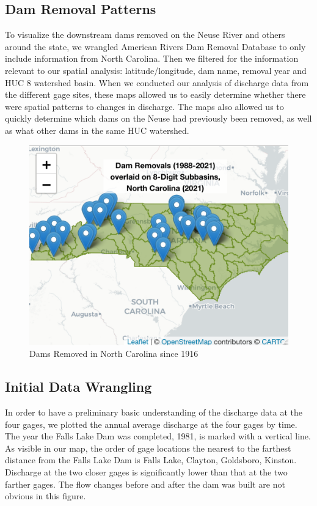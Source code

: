\documentclass[
  12pt,
]{article}
\begin{document}
\hypertarget{dam-removal-patterns}{%
\subsection{Dam Removal Patterns}\label{dam-removal-patterns}}

To visualize the downstream dams removed on the Neuse River and others
around the state, we wrangled American Rivers Dam Removal Database to
only include information from North Carolina. Then we filtered for the
information relevant to our spatial analysis: latitude/longitude, dam
name, removal year and HUC 8 watershed basin. When we conducted our
analysis of discharge data from the different gage sites, these maps
allowed us to easily determine whether there were spatial patterns to
changes in discharge. The maps also allowed us to quickly determine
which dams on the Neuse had previously been removed, as well as what
other dams in the same HUC watershed.

\begin{figure}
\centering
\includegraphics{"./Output/dam.removal.map.png"}
\caption{Dams Removed in North Carolina since 1916}
\end{figure}

\hypertarget{initial-data-wrangling}{%
\subsection{Initial Data Wrangling}\label{initial-data-wrangling}}

In order to have a preliminary basic understanding of the discharge data
at the four gages, we plotted the annual average discharge at the four
gages by time. The year the Falls Lake Dam was completed, 1981, is
marked with a vertical line. As visible in our map, the order of gage
locations the nearest to the farthest distance from the Falls Lake Dam
is Falls Lake, Clayton, Goldsboro, Kinston. Discharge at the two closer
gages is significantly lower than that at the two farther gages. The
flow changes before and after the dam was built are not obvious in this
figure.
\end{document}
